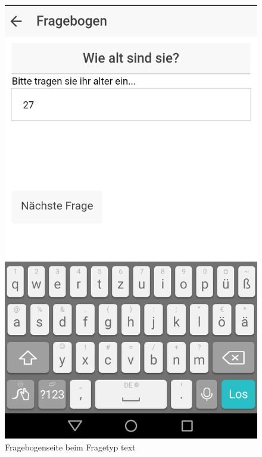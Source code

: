\begin{figure}[H]
	\centering
	\includegraphics[scale=0.3]{images/Screenshots/PatientClient/Fragebogen_text}
	\caption[Fragebogenseite beim Fragetyp text]{Fragebogenseite beim Fragetyp text}
	\label{PatientClient_Fragebogen_text}
\end{figure}


